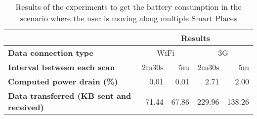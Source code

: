 \begin{table}[]
\centering
\begin{tabular}{@{}|l|r|r|r|r|@{}}
\toprule
\textbf{}                                        & \multicolumn{4}{c|}{\textbf{Results}}               \\ \midrule
\textbf{Data connection type}                    & \multicolumn{2}{c|}{WiFi} & \multicolumn{2}{c|}{3G} \\ \midrule
\textbf{Interval between each scan}              & 2m30s       & 5m          & 2m30s      & 5m         \\ \midrule
\textbf{Computed power drain (\%)}               & 0.01        & 0.01        & 2.71       & 2.00       \\ \midrule
\textbf{Data transferred (KB sent and received)} & 71.44       & 67.86       & 229.96     & 138.26     \\ \bottomrule
\end{tabular}
\caption[Power drain when the user is moving]{Results of the experiments to get the battery consumption in the scenario where the user is moving along multiple Smart Places}
\label{tab:results_battery_walking}
\end{table}

